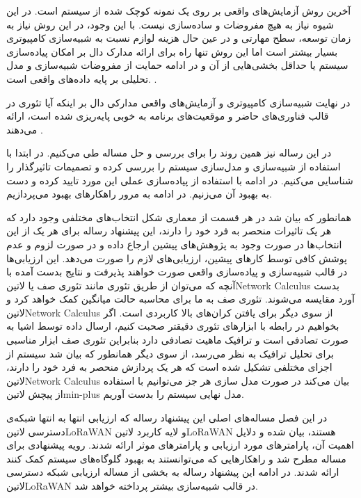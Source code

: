 آخرین روش آزمایش‌های واقعی بر روی یک نمونه کوچک شده از سیستم است.
در این شیوه نیاز به هیچ مفروضات و ساده‌سازی نیست.
با این وجود، در این روش نیاز به زمان توسعه، سطح مهارتی و در عین حال هزینه لوازم نسبت به شبیه‌سازی کامپیوتری بسیار بیشتر است
اما این روش تنها راه برای ارائه مدارک دال بر امکان پیاده‌سازی سیستم یا حداقل بخشی‌هایی از آن و در ادامه حمایت از مفروضات شبیه‌سازی
و مدل تحلیلی بر پایه داده‌های واقعی است.
.

در نهایت شبیه‌سازی کامپیوتری و آزمایش‌های واقعی مدارکی دال بر اینکه آیا تئوری در قالب فناوری‌های حاضر و موقعیت‌های برنامه
به خوبی پایه‌ریزی شده است، ارائه می‌دهند
.

در این رساله نیز همین روند را برای بررسی و حل مساله طی می‌کنیم. در ابتدا با استفاده از شبیه‌سازی و مدل‌سازی سیستم را بررسی کرده
و تصمیمات تاثیرگذار را شناسایی می‌کنیم. در ادامه با استفاده از پیاده‌سازی عملی این مورد تایید کرده و دست به بهبود آن می‌زنیم.
در ادامه به مرور راهکارهای بهبود می‌پردازیم.

همانطور که بیان شد در هر قسمت از معماری شکل  انتخاب‌های مختلفی وجود دارد که هر یک تاثیرات منحصر به فرد خود را دارند،
این پیشنهاد رساله برای هر یک از این انتخاب‌ها در صورت وجود به پژوهش‌های پیشین ارجاع داده و در صورت لزوم و عدم پوشش کافی توسط کارهای پیشین، ارزیابی‌های لازم را صورت می‌دهد.
این ارزیابی‌ها در قالب شبیه‌سازی و پیاده‌سازی واقعی صورت خواهند پذیرفت و نتایج بدست آمده با آنچه که می‌توان از طریق تئوری مانند تئوری صف یا ‌لاتین{Network Calculus}
بدست آورد مقایسه می‌شوند. تئوری صف به ما برای محاسبه حالت میانگین کمک خواهد کرد و ‌لاتین{Network Calculus} از سوی دیگر برای یافتن کران‌های بالا کاربردی است.
اگر بخواهیم در رابطه با ابزارهای تئوری دقیقتر صحبت کنیم، ارسال داده توسط اشیا به صورت تصادفی است و ترافیک ماهیت تصادفی دارد بنابراین تئوری صف ابزار مناسبی برای تحلیل ترافیک به نظر می‌رسد،
از سوی دیگر همانطور که بیان شد سیستم از اجزای مختلفی تشکیل شده است که هر یک پردازش منحصر به فرد خود را دارند، ‌لاتین{Network Calculus} بیان می‌کند در صورت مدل سازی هر جز
می‌توانیم با استفاده از پیچش ‌لاتین{min-plus} مدل نهایی سیستم را بدست آوریم.


در این فصل مساله‌های اصلی این پیشنهاد رساله که ارزیابی انتها به انتها شبکه‌ی دسترسی ‌لاتین{LoRaWAN}
و لایه کاربرد ‌لاتین{LoRaWAN} هستند،
بیان شده و دلایل اهمیت آن، پارامترهای مورد ارزیابی و پارامترهای موثر ارائه شدند.
رویه پیشنهادی برای مساله مطرح شد و راهکارهایی که می‌توانستند به بهبود گلوگاه‌های سیستم کمک کنند ارائه شدند.
در ادامه این پیشنهاد رساله به بخشی از مساله ارزیابی شبکه دسترسی ‌لاتین{LoRaWAN} در قالب شبیه‌سازی بیشتر پرداخته خواهد شد.
